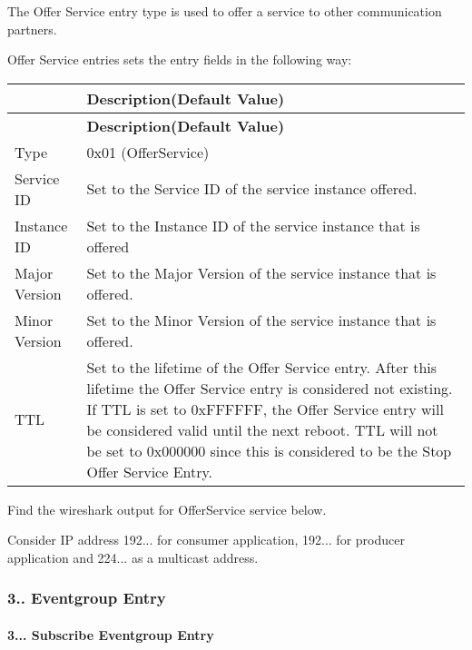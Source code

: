 \begin{DoxyItemize}
\item The Offer Service entry type is used to offer a service to other communication partners.
\item Offer Service entries sets the entry fields in the following way\+: \tabulinesep=1mm
\begin{longtabu} spread 0pt [c]{*2{|X[-1]}|}
\hline
{}&{\bf Description(\+Default Value)  }\\
\endfirsthead
\hline
\endfoot
\hline
{}&{\bf Description(\+Default Value)  }\\
\endhead
Type &0x01 (Offer\+Service) \\
Service ID &Set to the Service ID of the service instance offered. \\
Instance ID &Set to the Instance ID of the service instance that is offered \\
Major Version &Set to the Major Version of the service instance that is offered. \\
Minor Version &Set to the Minor Version of the service instance that is offered. \\
T\+TL &Set to the lifetime of the Offer Service entry. After this lifetime the Offer Service entry is considered not existing. If T\+TL is set to 0x\+F\+F\+F\+F\+FF, the Offer Service entry will be considered valid until the next reboot. T\+TL will not be set to 0x000000 since this is considered to be the Stop Offer Service Entry. \\
\end{longtabu}

\item Find the wireshark output for Offer\+Service service below.
\item Consider IP address 192... for consumer application, 192... for producer application and 224... as a multicast address.
\end{DoxyItemize}

 \subsubsection*{3.. Eventgroup Entry}

\paragraph*{3... Subscribe Eventgroup Entry}


